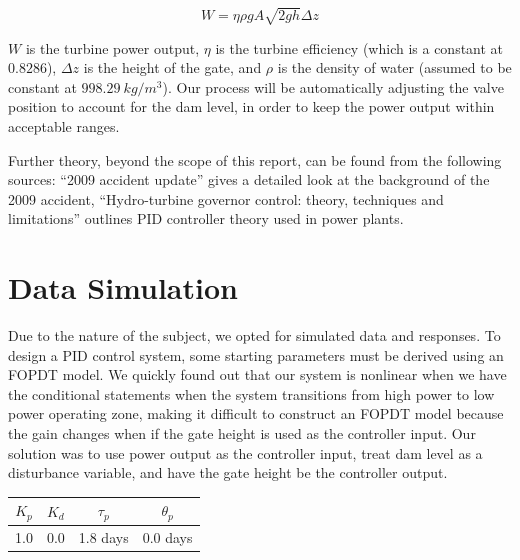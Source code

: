 \documentclass{article}
\begin{document}
\begin{multicols*}{2}
        \begin{equation}\label{powerEq}
            W=\eta \rho gA\sqrt{2gh}\Delta z
        \end{equation}

        $W$ is the turbine power output, $\eta$ is the turbine efficiency (which is a constant at $0.8286$), $\Delta z$ is the height of the gate, and $\rho$ is the density of water (assumed to be constant at $998.29\ kg/m^3$). Our process will be automatically adjusting the valve position to account for the dam level, in order to keep the power output within acceptable ranges.

        Further theory, beyond the scope of this report, can be found from the following sources: “2009 accident update” \cite{SayanoAccidentUpdate} gives a detailed look at the background of the 2009 accident, “Hydro-turbine governor control: theory, techniques and limitations” \cite{htgc} outlines PID controller theory used in power plants.

        \section{Data Simulation}

        Due to the nature of the subject, we opted for simulated data and responses. To design a PID control system, some starting parameters must be derived using an FOPDT model.  We quickly found out that our system is nonlinear when we have the conditional statements when the system transitions from high power to low power operating zone, making it difficult to construct an FOPDT model because the gain changes when if the gate height is used as the controller input.  Our solution was to use power output as the controller input, treat dam level as a disturbance variable, and have the gate height be the controller output.

        \vspace{1ex}

        \begin{minipage}{0.9\columnwidth}
            \label{foParams}
            \vspace{-1ex}
            \begin{center}
            \begin{tabular}{cccc}
                    \toprule
                    $K_p$ & $K_d$ & $\tau_p$ & $\theta_p$ \\
                    \midrule
                    1.0 & 0.0 & 1.8 days & 0.0 days
                \end{tabular}
            \end{center}
        \end{minipage}


\end{multicols*}
\end{document}
